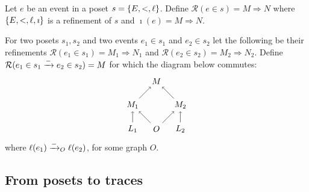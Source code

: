 \begin{definition}
  Let $e$ be an event in a poset $s=\{E,<,\ell\}$.
  Define $\mathcal{R}(e\in s) = M\Rightarrow N$ where $\{E,<,\ell,\imath\}$ is a refinement of $s$ and $\imath(e) = M\Rightarrow N$.
\end{definition}

\begin{definition}
\label{def:ref_neg_infl}
  For two posets $s_1,s_2$ and two events $e_1\in s_1$ and $e_2\in s_2$ let the following be their refinements $\mathcal{R}(e_1\in s_1) = M_1\Rightarrow N_1$ and $\mathcal{R}(e_2\in s_2) = M_2\Rightarrow N_2$. Define $\mathcal{R}(e_1\in s_1\mathrel{\xrightarrow{-}} e_2\in s_2) = M$ for which the diagram below commutes:
  \[
  \begin{tikzpicture} %
    \node (o) at (0,0) {\(O\)};
    \node (n) at (0,2) {\(M\)};
    \node (l1) at (-1,0) {\(L_1\)};
    \node (l2) at (1,0) {\(L_2\)};
    \node (n1) at (-1,1) {\(M_1\)};
    \node (n2) at (1,1) {\(M_2\)};
    \draw [->] (l1) -- (n1);
    \draw [->] (l2) -- (n2);
    \draw [->] (o) -- (n1);
    \draw [->] (o) -- (n2);
    \draw [->] (n1) -- (n);
    \draw [->] (n2) -- (n);
  \end{tikzpicture}
  \]
  where $\ell(e_1)\mathrel{\xrightarrow{-}}_O\ell(e_2)$, for some graph $O$.
\end{definition}

\subsection{From posets to traces}

